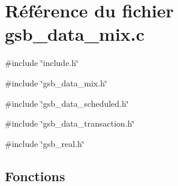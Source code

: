 \section{Référence du fichier gsb\_\-data\_\-mix.c}
\label{gsb__data__mix_8c}
{\ttfamily \#include \char`\"{}include.h\char`\"{}}\par
{\ttfamily \#include \char`\"{}gsb\_\-data\_\-mix.h\char`\"{}}\par
{\ttfamily \#include \char`\"{}gsb\_\-data\_\-scheduled.h\char`\"{}}\par
{\ttfamily \#include \char`\"{}gsb\_\-data\_\-transaction.h\char`\"{}}\par
{\ttfamily \#include \char`\"{}gsb\_\-real.h\char`\"{}}\par
\subsection*{Fonctions}
